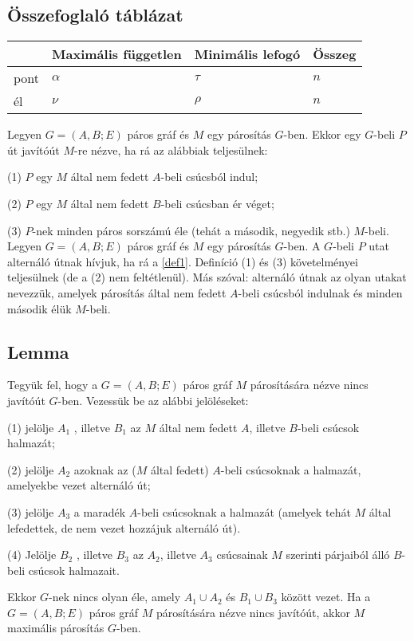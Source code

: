 \documentclass[12pt,a4paper,twoside]{report}
\begin{document}
\subsection{Összefoglaló táblázat}
\begin{table}[th]
	\begin{tabular}{|l|l|l|l|}
		\hline
		& Maximális független & Minimális lefogó & Összeg \\ \hline
		pont & $\alpha$      & $\tau$           & $n$      \\ \hline
		él   & $\nu$         & $\rho$           & $n$      \\ \hline
	\end{tabular}
\end{table}
\df 
Legyen $G = (A, B; E)$ páros gráf és $M$ egy párosítás $G$-ben. Ekkor
egy $G$-beli $P$ út javítóút $M$-re nézve, ha rá az alábbiak teljesülnek:

(1) $P$ egy $M$ által nem fedett $A$-beli csúcsból indul;

(2) $P$ egy $M$ által nem fedett $B$-beli csúcsban ér véget;

(3) $P$-nek minden páros sorszámú éle (tehát a második, negyedik stb.) $M$-beli.
\df\label{def1} 
Legyen $G = (A, B; E)$ páros gráf és $M$ egy párosítás $G$-ben. A
$G$-beli $P$ utat alternáló útnak hívjuk, ha rá a  \ref{def1}. Definíció (1) és (3) követelményei teljesülnek (de a (2) nem feltétlenül). Más szóval: alternáló útnak az olyan utakat nevezzük, amelyek párosítás által nem fedett $A$-beli csúcsból indulnak és minden második élük $M$-beli.
\subsection{Lemma}
Tegyük fel, hogy a $G = (A, B; E)$ páros gráf $M$ párosítására nézve nincs javítóút $G$-ben. Vezessük be az alábbi jelöléseket:

(1) jelölje $A_1$ , illetve $B_1$ az $M$ által nem fedett $A$, illetve $B$-beli csúcsok halmazát;

(2) jelölje $A_2$ azoknak az ($M$ által fedett) $A$-beli csúcsoknak a halmazát, amelyekbe vezet alternáló út;

(3) jelölje $A_3$ a maradék $A$-beli csúcsoknak a halmazát (amelyek tehát $M$ által
lefedettek, de nem vezet hozzájuk alternáló út).

(4) Jelölje $B_2$ , illetve $B_3$ az $A_2$, illetve $A_3$ csúcsainak $M$ szerinti párjaiból álló $B$-beli csúcsok halmazait.

Ekkor $G$-nek nincs olyan éle, amely $A_1 \cup A_2$ és $B_1 \cup B_3$ között vezet.
\ttl
Ha a $G = (A, B; E)$ páros gráf $M$ párosítására nézve nincs javítóút,
akkor $M$ maximális párosítás $G$-ben.
\end{document}

